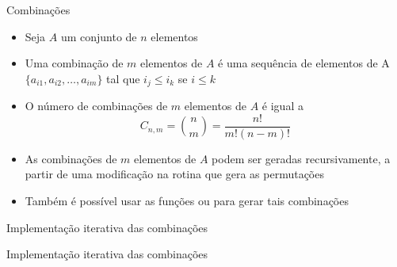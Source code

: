 \begin{frame}[fragile]{Combinações}

    \begin{itemize}
        \item Seja $A$ um conjunto de $n$ elementos

        \item Uma combinação de $m$ elementos de $A$ é uma sequência de elementos de
            A $\lbrace a_{i1}, a_{i2}, \ldots, a_{im}\rbrace$ tal que $i_j \leq i_k$ se $i\leq k$

        \item O número de combinações de $m$ elementos de $A$ é igual a 
        \[
            C_{n,m} = \binom{n}{m} = \frac{n!}{m!(n - m)!}
        \]

        \item As combinações de $m$ elementos de $A$ podem ser geradas recursivamente, a
            partir de uma modificação na rotina que gera as permutações

        \item Também é possível usar as funções  ou
             para gerar tais combinações
            
    \end{itemize}

\end{frame}

\begin{frame}[fragile]{Implementação iterativa das combinações}
\end{frame}

\begin{frame}[fragile]{Implementação iterativa das combinações}
\end{frame}




